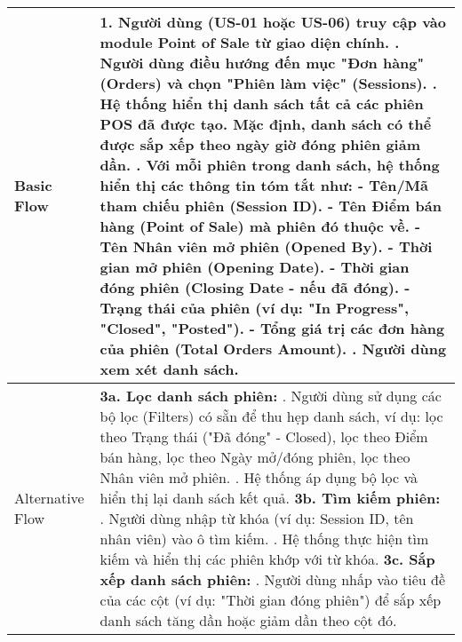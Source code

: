 \begin{longtable}{|m{4cm}|p{11cm}|}
\hline
Basic Flow & 1. Người dùng (US-01 hoặc US-06) truy cập vào module Point of Sale từ giao diện chính. \newline 2. Người dùng điều hướng đến mục "Đơn hàng" (Orders) và chọn "Phiên làm việc" (Sessions). \newline 3. Hệ thống hiển thị danh sách tất cả các phiên POS đã được tạo. Mặc định, danh sách có thể được sắp xếp theo ngày giờ đóng phiên giảm dần. \newline 4. Với mỗi phiên trong danh sách, hệ thống hiển thị các thông tin tóm tắt như: \newline    - Tên/Mã tham chiếu phiên (Session ID). \newline    - Tên Điểm bán hàng (Point of Sale) mà phiên đó thuộc về. \newline    - Tên Nhân viên mở phiên (Opened By). \newline    - Thời gian mở phiên (Opening Date). \newline    - Thời gian đóng phiên (Closing Date - nếu đã đóng). \newline    - Trạng thái của phiên (ví dụ: "In Progress", "Closed", "Posted"). \newline    - Tổng giá trị các đơn hàng của phiên (Total Orders Amount). \newline 5. Người dùng xem xét danh sách. \\
\hline
Alternative Flow & \textbf{3a. Lọc danh sách phiên:} \newline    1. Người dùng sử dụng các bộ lọc (Filters) có sẵn để thu hẹp danh sách, ví dụ: lọc theo Trạng thái ("Đã đóng" - Closed), lọc theo Điểm bán hàng, lọc theo Ngày mở/đóng phiên, lọc theo Nhân viên mở phiên. \newline    2. Hệ thống áp dụng bộ lọc và hiển thị lại danh sách kết quả. \newline \textbf{3b. Tìm kiếm phiên:} \newline    1. Người dùng nhập từ khóa (ví dụ: Session ID, tên nhân viên) vào ô tìm kiếm. \newline    2. Hệ thống thực hiện tìm kiếm và hiển thị các phiên khớp với từ khóa. \newline \textbf{3c. Sắp xếp danh sách phiên:} \newline    1. Người dùng nhấp vào tiêu đề của các cột (ví dụ: "Thời gian đóng phiên") để sắp xếp danh sách tăng dần hoặc giảm dần theo cột đó. \\
\hline

\end{longtable}
